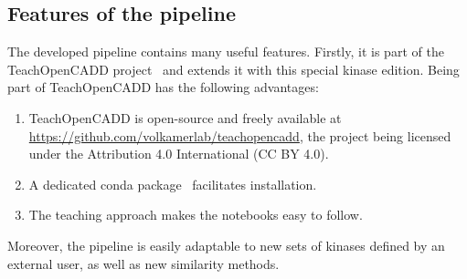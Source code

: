 \documentclass[9pt,training]{livecoms}
\begin{document}
\subsection{Features of the pipeline}
The developed pipeline contains many useful features. Firstly, it is part of the TeachOpenCADD project~\cite{Sydow_2019_JCheminform, Sydow_2021_toc_chemrxiv} and extends it with this special kinase edition. Being part of TeachOpenCADD has the following advantages:
\begin{enumerate}
    \item TeachOpenCADD is open-source and freely available at \href{https://github.com/volkamerlab/teachopencadd}{https://github.com/volkamerlab/teachopencadd}, the project being licensed under the Attribution 4.0 International (CC BY 4.0).
    \item A dedicated conda package~\cite{conda_forge} facilitates installation.
    \item The teaching approach makes the notebooks easy to follow.
\end{enumerate}
Moreover, the pipeline is easily adaptable to new sets of kinases defined by an external user, as well as new similarity methods.
\end{document}
